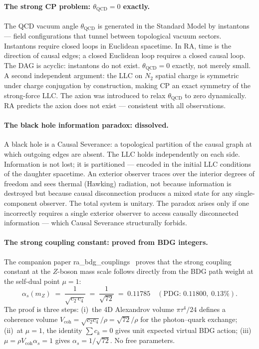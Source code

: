 \documentclass[11pt,a4paper]{article}
\begin{document}
\paragraph{The strong CP problem: $\theta_{\mathrm{QCD}} = 0$ exactly.}
The QCD vacuum angle $\theta_{\mathrm{QCD}}$ is generated in the Standard
Model by instantons — field configurations that tunnel between topological
vacuum sectors. Instantons require closed loops in Euclidean spacetime.
In RA, time is the direction of causal edges; a closed Euclidean loop
requires a closed causal loop. The DAG is acyclic: instantons do not exist.
$\theta_{\mathrm{QCD}} = 0$ exactly, not merely small. A second independent
argument: the LLC on $N_2$ spatial charge is symmetric under charge conjugation
by construction, making CP an exact symmetry of the strong-force LLC.
The axion was introduced to relax $\theta_{\mathrm{QCD}}$ to zero dynamically.
RA predicts the axion does not exist — consistent with all observations.

\paragraph{The black hole information paradox: dissolved.}
A black hole is a Causal Severance: a topological partition of the causal
graph at which outgoing edges are absent. The LLC holds independently on
each side. Information is not lost; it is partitioned — encoded in the
initial LLC conditions of the daughter spacetime. An exterior observer
traces over the interior degrees of freedom and sees thermal (Hawking)
radiation, not because information is destroyed but because causal
disconnection produces a mixed state for any single-component observer.
The total system is unitary. The paradox arises only if one incorrectly
requires a single exterior observer to access causally disconnected
information — which Causal Severance structurally forbids.

\paragraph{The strong coupling constant: proved from BDG integers.}
The companion paper ra\_bdg\_couplings~\citep{Sandeman2026BDG} proves that
the strong coupling constant at the $Z$-boson mass scale follows directly
from the BDG path weight at the self-dual point $\mu=1$:
\begin{equation}
  \alpha_s(m_Z) \;=\; \frac{1}{\sqrt{c_2\,c_4}}
  \;=\; \frac{1}{\sqrt{72}} \;=\; 0.11785
  \quad (\text{PDG: } 0.11800,\; 0.13\%).
\end{equation}
The proof is three steps: (i)~the 4D Alexandrov volume $\pi\tau^4/24$
defines a coherence volume $V_{\mathrm{coh}} = \sqrt{c_2 c_4}/\rho = \sqrt{72}/\rho$
for the photon--quark exchange; (ii)~at $\mu=1$, the identity $\sum c_k=0$
gives unit expected virtual BDG action; (iii)~$\mu = \rho V_{\mathrm{coh}} \alpha_s = 1$
gives $\alpha_s = 1/\!\sqrt{72}$.  No free parameters.
\end{document}
